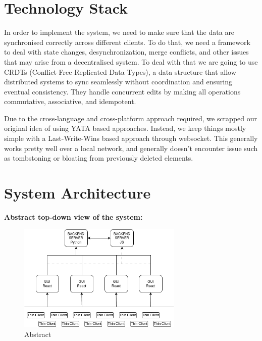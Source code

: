 \documentclass[12pt,a4paper]{article}
\renewcommand\_{\textunderscore\allowbreak}
\begin{document}
\section{Technology Stack}
In order to implement the system, we need to make sure that the data are synchronised correctly across different clients. To do that, we need a framework to deal with state changes, desynchronization, merge conflicts, and other issues that may arise from a decentralised system. To deal with that we are going to use CRDTs (Conflict-Free Replicated Data Types), a data structure that allow distributed systems to sync seamlessly without coordination and ensuring eventual consistency. They handle concurrent edits by making all operations commutative, associative, and idempotent.

Due to the cross-language and cross-platform approach required, we scrapped our original idea of using YATA based approaches.  Instead, we keep things mostly simple with a Last-Write-Wins based approach through websocket.  This generally works pretty well over a local network, and generally doesn't encounter issue such as tombstoning or bloating from previously deleted elements.

\newpage
\section{System Architecture}
\textbf{Abstract top-down view of the system:}

\begin{figure}[H]
\caption{Abstract}
\centering
\includegraphics[width=0.7\textwidth]{topdown.drawio}
\end{figure}
\end{document}
